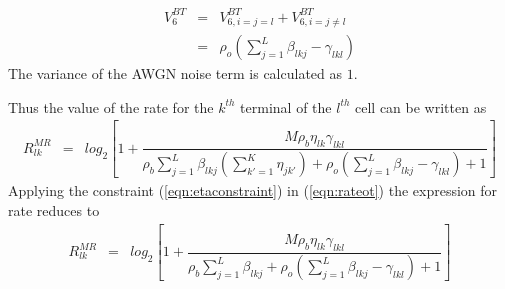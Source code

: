 \documentclass[10pt, a4paper, twoside,fleqn]{article}
\begin{document}
\begin{eqnarray}\label{eqn:v6}
   V_6^{BT} &=& V_{6,i=j=l}^{BT} + V_{6,i=j\neq l}^{BT} \nonumber \\ &=&\rho_o\left(\sum\limits_{j=1}^{L}\beta_{lkj}-\gamma_{lkl}\right)
\end{eqnarray}
The variance of the AWGN noise term is calculated as $1$.

Thus the value of the rate for the $k^{th}$ terminal of the $l^{th}$ cell can be written as
\begin{eqnarray}\label{eqn:rateot}
R_{lk}^{MR} %
        &=& log_2\left[1+\dfrac{M\rho_b\eta_{lk}\gamma_{lkl}}{\rho_b\sum\limits_{j=1}^{L}\beta_{lkj}\left(\sum\limits_{k'=1}^{K}\eta_{jk'}\right)+\rho_o\left(\sum\limits_{j=1}^{L}\beta_{lkj} -\gamma_{lkl}\right)+1}\right]
\end{eqnarray}
Applying the constraint (\ref{eqn:etaconstraint}) in (\ref{eqn:rateot}) the expression for rate reduces to
\begin{eqnarray}\label{eqn:finalratebt}
R_{lk}^{MR} &=& log_2\left[1+\dfrac{M\rho_b\eta_{lk}\gamma_{lkl}}{\rho_b\sum\limits_{j=1}^{L}\beta_{lkj}+\rho_o\left(\sum\limits_{j=1}^{L}\beta_{lkj} -\gamma_{lkl}\right)+1}\right]
\end{eqnarray}
\end{document}
